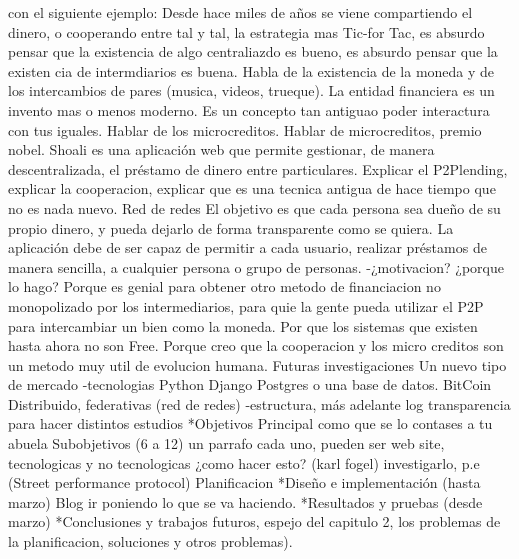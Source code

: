  con el siguiente ejemplo:
Desde hace miles de años se viene compartiendo el dinero, o cooperando entre tal y tal, la estrategia mas Tic-for Tac, es absurdo pensar que la existencia de algo centraliazdo es bueno, es absurdo pensar que la existen cia de intermdiarios es buena. Habla de la existencia de la moneda y de los intercambios de pares (musica, videos, trueque). La entidad financiera es un invento mas o menos moderno. Es un concepto tan antiguao poder interactura con tus iguales. Hablar de los microcreditos.
Hablar de microcreditos, premio nobel.
Shoali es una aplicación web que permite gestionar, de manera descentralizada, el préstamo de dinero entre particulares. Explicar el P2Plending, explicar la cooperacion, explicar que es una tecnica antigua de hace tiempo que no es nada nuevo. Red de redes
El objetivo es que cada persona sea dueño de su propio dinero, y pueda dejarlo de forma transparente como se quiera. La aplicación debe de ser capaz de permitir a cada usuario, realizar préstamos de manera sencilla, a cualquier persona o grupo de personas.
-¿motivacion? ¿porque lo hago?
Porque es genial para obtener otro metodo de financiacion no monopolizado por los intermediarios, para quie la gente pueda utilizar el P2P para intercambiar un bien como la moneda. Por que los sistemas que existen hasta ahora no son Free. Porque creo que la cooperacion y los micro creditos son un metodo muy util de evolucion humana.
Futuras investigaciones
Un nuevo tipo de mercado
-tecnologias
Python
Django
Postgres o una base de datos.
BitCoin
Distribuido, federativas (red de redes)
-estructura, más adelante
log transparencia para hacer distintos estudios
*Objetivos
Principal como que se lo contases a tu abuela
Subobjetivos (6 a 12) un parrafo cada uno, pueden ser web site, tecnologicas y no tecnologicas ¿como hacer esto? (karl fogel) investigarlo, p.e (Street performance protocol)
Planificacion
*Diseño e implementación (hasta marzo) Blog ir poniendo lo que se va haciendo.
*Resultados y pruebas (desde marzo)
*Conclusiones y trabajos futuros, espejo del capitulo 2, los problemas de la planificacion, soluciones y otros problemas).
